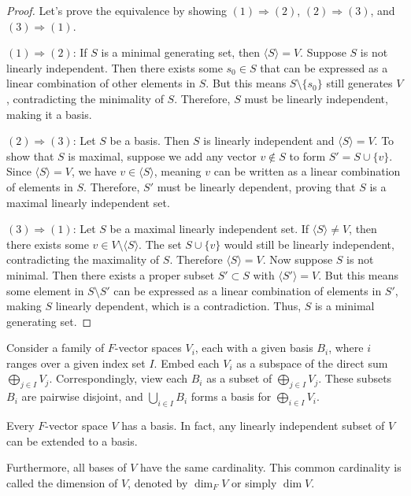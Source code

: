 \begin{proof}
  Let's prove the equivalence by showing $(1) \Rightarrow (2)$, $(2) \Rightarrow (3)$, and $(3) \Rightarrow (1)$.

  $(1) \Rightarrow (2)$: If $S$ is a minimal generating set, then $\langle S \rangle = V$. Suppose $S$ is not linearly independent. Then there exists some $s_0 \in S$ that can be expressed as a linear combination of other elements in $S$. But this means $S \setminus \{s_0\}$ still generates $V$, contradicting the minimality of $S$. Therefore, $S$ must be linearly independent, making it a basis.

  $(2) \Rightarrow (3)$: Let $S$ be a basis. Then $S$ is linearly independent and $\langle S \rangle = V$. To show that $S$ is maximal, suppose we add any vector $v \not\in S$ to form $S' = S \cup \{v\}$. Since $\langle S \rangle = V$, we have $v \in \langle S \rangle$, meaning $v$ can be written as a linear combination of elements in $S$. Therefore, $S'$ must be linearly dependent, proving that $S$ is a maximal linearly independent set.

  $(3) \Rightarrow (1)$: Let $S$ be a maximal linearly independent set. If $\langle S \rangle \neq V$, then there exists some $v \in V \setminus \langle S \rangle$. The set $S \cup \{v\}$ would still be linearly independent, contradicting the maximality of $S$. Therefore $\langle S \rangle = V$. Now suppose $S$ is not minimal. Then there exists a proper subset $S' \subset S$ with $\langle S' \rangle = V$. But this means some element in $S \setminus S'$ can be expressed as a linear combination of elements in $S'$, making $S$ linearly dependent, which is a contradiction. Thus, $S$ is a minimal generating set.
\end{proof}

\begin{proposition}
  Consider a family of $F$-vector spaces $V_i$, each with a given basis $B_i$, where $i$ ranges over a given index set $I$.
  Embed each $V_i$ as a subspace of the direct sum $\bigoplus_{j \in I} V_j$.
  Correspondingly, view each $B_i$ as a subset of $\bigoplus_{j \in I} V_j$.
  These subsets $B_i$ are pairwise disjoint, and $\bigcup_{i \in I} B_i$ forms a basis for $\bigoplus_{i \in I} V_i$.
\end{proposition}

\begin{definition}
  Every $F$-vector space $V$ has a basis. In fact, any linearly independent subset of $V$ can be extended to a basis.

  Furthermore, all bases of $V$ have the same cardinality. This common cardinality is called the dimension of $V$, denoted by $\dim_F V$ or simply $\dim V$.
\end{definition}

